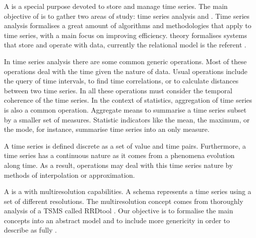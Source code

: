 A  is a special purpose  devoted to store and
manage time series.  The main objective of  is to gather
two areas of study: time series analysis and .  Time series
analysis formalises a great amount of algorithms and methodologies
that apply to time series, with a main focus on improving
efficiency.  theory formalises systems that store and
operate with data, currently the relational model is the referent
\cite{date:introduction}.





In time series analysis there are some common generic operations.
Most of these operations deal with the time given the nature of data.
Usual operations include the query of time intervals, to find time
correlations, or to calculate distances between two time series. In
all these operations  must consider the temporal coherence
of the time series.  In the context of statistics, aggregation of time
series is also a common operation. Aggregate means to summarise a time
series subset by a smaller set of measures. Statistic indicators like
the mean, the maximum, or the mode, for instance, summarise time
series into an only measure.

A time series is defined discrete as a set of value and time
pairs. Furthermore, a time series has a continuous nature as it comes
from a phenomena evolution along time. As a result, 
operations may deal with this time series nature by methods of
interpolation or approximation.


A  is a  with multiresolution capabilities.  A
 schema represents a time series using a set of different
resolutions.  The multiresolution concept comes from thoroughly
analysis of a TSMS called RRDtool \cite{rrdtool}. Our objective is to
formalise the main concepts into an abstract model and to include more
genericity in order to describe  as fully .



